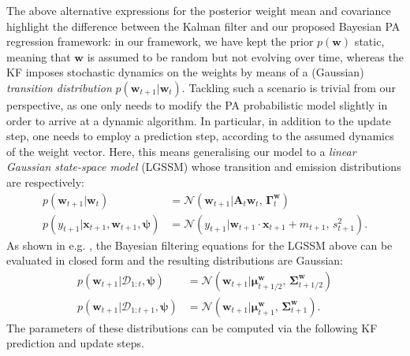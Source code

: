 The above alternative expressions for the posterior weight mean and covariance highlight the difference between the Kalman filter and our proposed Bayesian PA regression framework: in our framework, we have kept the prior $p(\mathbf{w})$ static, meaning that $\mathbf{w}$ is assumed to be random but not evolving over time, whereas the KF imposes stochastic dynamics on the weights by means of a (Gaussian) \emph{transition distribution} $p(\mathbf{w}_{t+1}|\mathbf{w}_t)$. Tackling such a scenario is trivial from our perspective, as one only needs to modify the PA probabilistic model slightly in order to arrive at a dynamic algorithm. In particular, in addition to the update step, one needs to employ a prediction step, according to the assumed dynamics of the weight vector. Here, this means generalising our model to a \emph{linear Gaussian state-space model} (LGSSM) whose transition and emission distributions are respectively:
\begin{align}
	p(\mathbf{w}_{t+1}|\mathbf{w}_t)
	&= \mathcal{N}(\mathbf{w}_{t+1}|\mathbf{A}_t\mathbf{w}_t,\, \mathbf{\Gamma}_t^\mathbf{w})
	\\
	p(y_{t+1}|\mathbf{x}_{t+1}, \mathbf{w}_{t+1}, \boldsymbol{\psi})
	&= \mathcal{N}(y_{t+1}|\mathbf{w}_{t+1}\cdot\mathbf{x}_{t+1} + m_{t+1},\, s_{t+1}^2).
\end{align}
As shown in e.g. \citep[Theorem~4.2]{sarkka13}, the Bayesian filtering equations for the LGSSM above can be evaluated in closed form and the resulting distributions are Gaussian:
\begin{align}
	p(\mathbf{w}_{t+1}|\mathcal{D}_{1:t}, \boldsymbol{\psi})
	&= \mathcal{N}(\mathbf{w}_{t+1}|\boldsymbol{\mu}_{t+1/2}^\mathbf{w},\, \boldsymbol{\Sigma}_{t+1/2}^\mathbf{w})
	\\
	p(\mathbf{w}_{t+1}|\mathcal{D}_{1:t+1}, \boldsymbol{\psi})
	&= \mathcal{N}(\mathbf{w}_{t+1}|\boldsymbol{\mu}_{t+1}^\mathbf{w},\, \boldsymbol{\Sigma}_{t+1}^\mathbf{w}).
\end{align}
The parameters of these distributions can be computed via the following KF prediction and update steps.
